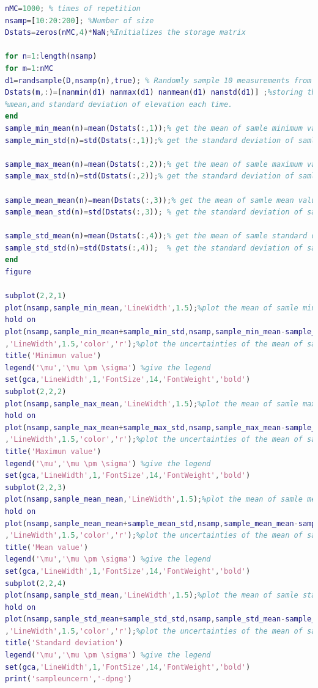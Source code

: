 \documentclass[
	12pt, %
]{fphw}
\begin{document}
  \begin{lstlisting}[language=Matlab,escapeinside=``]
nMC=1000; % times of repetition
nsamp=[10:20:200]; %Number of size
Dstats=zeros(nMC,4)*NaN;%Initializes the storage matrix

for n=1:length(nsamp)
for m=1:nMC
d1=randsample(D,nsamp(n),true); % Randomly sample 10 measurements from the elevations
Dstats(m,:)=[nanmin(d1) nanmax(d1) nanmean(d1) nanstd(d1)] ;%storing the minimum, maximum,
%mean,and standard deviation of elevation each time.
end
sample_min_mean(n)=mean(Dstats(:,1));% get the mean of samle minimum value
sample_min_std(n)=std(Dstats(:,1));% get the standard deviation of samle minimum value

sample_max_mean(n)=mean(Dstats(:,2));% get the mean of samle maximum value
sample_max_std(n)=std(Dstats(:,2));% get the standard deviation of samle maximum value

sample_mean_mean(n)=mean(Dstats(:,3));% get the mean of samle mean value
sample_mean_std(n)=std(Dstats(:,3)); % get the standard deviation of samle mean value   

sample_std_mean(n)=mean(Dstats(:,4));% get the mean of samle standard deviation value
sample_std_std(n)=std(Dstats(:,4));  % get the standard deviation of samle standard deviation value
end
figure

subplot(2,2,1)
plot(nsamp,sample_min_mean,'LineWidth',1.5);%plot the mean of samle minimum value
hold on
plot(nsamp,sample_min_mean+sample_min_std,nsamp,sample_min_mean-sample_min_std...
,'LineWidth',1.5,'color','r');%plot the uncertainties of the mean of samle minimum value
title('Minimun value')
legend('\mu','\mu \pm \sigma') %give the legend
set(gca,'LineWidth',1,'FontSize',14,'FontWeight','bold')
subplot(2,2,2)
plot(nsamp,sample_max_mean,'LineWidth',1.5);%plot the mean of samle maximum value
hold on
plot(nsamp,sample_max_mean+sample_max_std,nsamp,sample_max_mean-sample_max_std...
,'LineWidth',1.5,'color','r');%plot the uncertainties of the mean of samle maximum value
title('Maximun value')
legend('\mu','\mu \pm \sigma') %give the legend
set(gca,'LineWidth',1,'FontSize',14,'FontWeight','bold')
subplot(2,2,3)
plot(nsamp,sample_mean_mean,'LineWidth',1.5);%plot the mean of samle mean value
hold on
plot(nsamp,sample_mean_mean+sample_mean_std,nsamp,sample_mean_mean-sample_mean_std...
,'LineWidth',1.5,'color','r');%plot the uncertainties of the mean of samle mean value
title('Mean value')
legend('\mu','\mu \pm \sigma') %give the legend
set(gca,'LineWidth',1,'FontSize',14,'FontWeight','bold')
subplot(2,2,4)
plot(nsamp,sample_std_mean,'LineWidth',1.5);%plot the mean of samle standard deviation value
hold on
plot(nsamp,sample_std_mean+sample_std_std,nsamp,sample_std_mean-sample_std_std...
,'LineWidth',1.5,'color','r');%plot the uncertainties of the mean of samle standard deviation value
title('Standard deviation')
legend('\mu','\mu \pm \sigma') %give the legend
set(gca,'LineWidth',1,'FontSize',14,'FontWeight','bold')
print('sampleuncern','-dpng')

\end{lstlisting}
\end{document}

